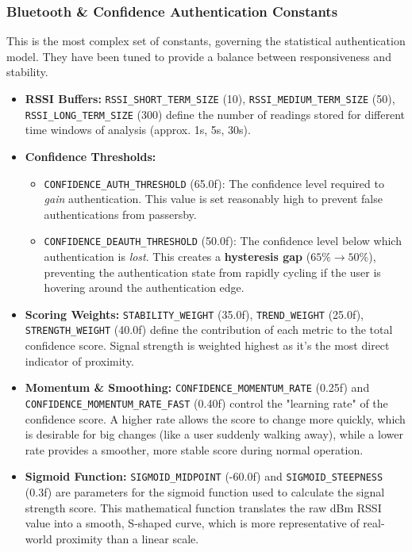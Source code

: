 \documentclass{article}
\begin{document}
\subsubsection{Bluetooth \& Confidence Authentication Constants}
This is the most complex set of constants, governing the statistical authentication model. They have been tuned to provide a balance between responsiveness and stability.
\begin{itemize}
    \item \textbf{RSSI Buffers:} \texttt{RSSI\_SHORT\_TERM\_SIZE} (10), \texttt{RSSI\_MEDIUM\_TERM\_SIZE} (50), \texttt{RSSI\_LONG\_TERM\_SIZE} (300) define the number of readings stored for different time windows of analysis (approx. 1s, 5s, 30s).
    \item \textbf{Confidence Thresholds:}
    \begin{itemize}
        \item \texttt{CONFIDENCE\_AUTH\_THRESHOLD} (65.0f): The confidence level required to \textit{gain} authentication. This value is set reasonably high to prevent false authentications from passersby.
        \item \texttt{CONFIDENCE\_DEAUTH\_THRESHOLD} (50.0f): The confidence level below which authentication is \textit{lost}. This creates a \textbf{hysteresis gap} ($65\% \rightarrow 50\%$), preventing the authentication state from rapidly cycling if the user is hovering around the authentication edge.
    \end{itemize}
    \item \textbf{Scoring Weights:} \texttt{STABILITY\_WEIGHT} (35.0f), \texttt{TREND\_WEIGHT} (25.0f), \texttt{STRENGTH\_WEIGHT} (40.0f) define the contribution of each metric to the total confidence score. Signal strength is weighted highest as it's the most direct indicator of proximity.
    \item \textbf{Momentum \& Smoothing:} \texttt{CONFIDENCE\_MOMENTUM\_RATE} (0.25f) and \texttt{CONFIDENCE\_MOMENTUM\_RATE\_FAST} (0.40f) control the "learning rate" of the confidence score. A higher rate allows the score to change more quickly, which is desirable for big changes (like a user suddenly walking away), while a lower rate provides a smoother, more stable score during normal operation.
    \item \textbf{Sigmoid Function:} \texttt{SIGMOID\_MIDPOINT} (-60.0f) and \texttt{SIGMOID\_STEEPNESS} (0.3f) are parameters for the sigmoid function used to calculate the signal strength score. This mathematical function translates the raw dBm RSSI value into a smooth, S-shaped curve, which is more representative of real-world proximity than a linear scale.
\end{itemize}
\end{document}

